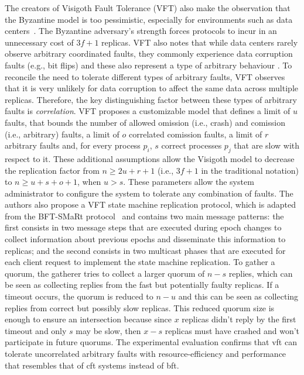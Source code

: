 The creators of Visigoth Fault Tolerance (VFT) also make the observation that the Byzantine model is too pessimistic, especially for environments such as data centers~\cite{Porto2015}. The Byzantine adversary's strength forces protocols to incur in an unnecessary cost of $3f+1$ replicas. VFT also notes that while data centers rarely observe arbitrary coordinated faults, they commonly experience data corruption faults (e.g., bit flips) and these also represent a type of arbitrary behaviour \cite{AmazonS31}\cite{AmazonS32}. To reconcile the need to tolerate different types of arbitrary faults, VFT observes that it is very unlikely for data corruption to affect the same data across multiple replicas. Therefore, the key distinguishing factor between these types of arbitrary faults is \textit{correlation}. VFT proposes a customizable model that defines a limit of $u$ faults, that bounds the number of allowed omission (i.e., crash) and comission (i.e., arbitrary) faults, a limit of $o$ correlated comission faults, a limit of $r$ arbitrary faults and, for every process $p_i$, $s$ correct processes $p_j$ that are slow with respect to it. These additional assumptions allow the Visigoth model to decrease the replication factor from $n \geq 2u+r+1$ (i.e., $3f+1$ in the traditional notation) to $n \geq u+s+o+1$, when $u > s$. These parameters allow the system administrator to configure the system to tolerate any combination of faults. The authors also propose a VFT state machine replication protocol, which is adapted from the BFT-SMaRt protocol~\cite{Bessani:2014} and contains two main message patterns: the first consists in two message steps that are executed during epoch changes to collect information about previous epochs and disseminate this information to replicas; and the second consists in two multicast phases that are executed for each client request to implement the state machine replication. To gather a quorum, the gatherer tries to collect a larger quorum of $n-s$ replies, which can be seen as collecting replies from the fast but potentially faulty replicas. If a timeout occurs, the quorum is reduced to $n-u$ and this can be seen as collecting replies from correct but possibly slow replicas. This reduced quorum size is enough to ensure an intersection because since $x$ replicas didn't reply by the first timeout and only $s$ may be slow, then $x-s$ replicas must have crashed and won't participate in future quorums. The experimental evaluation confirms that \acrshort{vft} can tolerate uncorrelated arbitrary faults with resource-efficiency and performance that resembles that of \acrshort{cft} systems instead of \acrshort{bft}. \par
